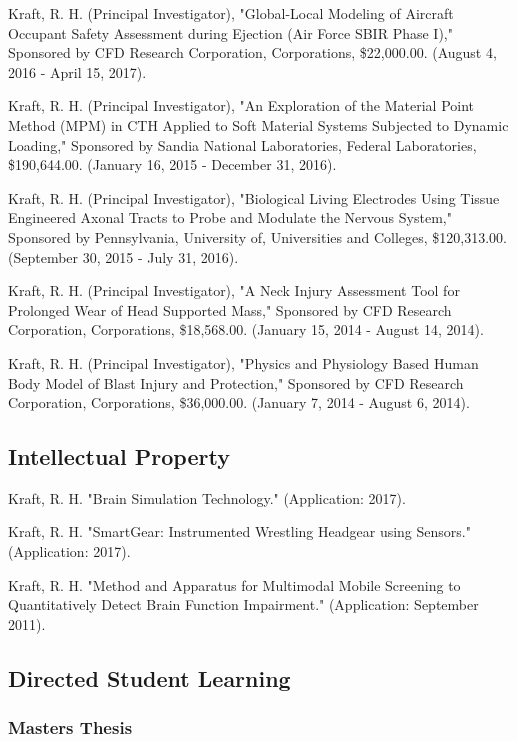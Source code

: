 \documentclass[
]{article}
\begin{document}
Kraft, R. H. (Principal Investigator), "Global-Local Modeling of
Aircraft Occupant Safety Assessment during Ejection (Air Force SBIR
Phase I)," Sponsored by CFD Research Corporation, Corporations,
\$22,000.00. (August 4, 2016 - April 15, 2017).

Kraft, R. H. (Principal Investigator), "An Exploration of the Material
Point Method (MPM) in CTH Applied to Soft Material Systems Subjected to
Dynamic Loading," Sponsored by Sandia National Laboratories, Federal
Laboratories, \$190,644.00. (January 16, 2015 - December 31, 2016).

Kraft, R. H. (Principal Investigator), "Biological Living Electrodes
Using Tissue Engineered Axonal Tracts to Probe and Modulate the Nervous
System," Sponsored by Pennsylvania, University of, Universities and
Colleges, \$120,313.00. (September 30, 2015 - July 31, 2016).

Kraft, R. H. (Principal Investigator), "A Neck Injury Assessment Tool
for Prolonged Wear of Head Supported Mass," Sponsored by CFD Research
Corporation, Corporations, \$18,568.00. (January 15, 2014 - August 14,
2014).

Kraft, R. H. (Principal Investigator), "Physics and Physiology Based
Human Body Model of Blast Injury and Protection," Sponsored by CFD
Research Corporation, Corporations, \$36,000.00. (January 7, 2014 -
August 6, 2014).

\subsection{Intellectual Property}\label{intellectual-property}

Kraft, R. H. "Brain Simulation Technology." (Application: 2017).

Kraft, R. H. "SmartGear: Instrumented Wrestling Headgear using Sensors."
(Application: 2017).

Kraft, R. H. "Method and Apparatus for Multimodal Mobile Screening to
Quantitatively Detect Brain Function Impairment." (Application:
September 2011).

\subsection{Directed Student Learning}\label{directed-student-learning}

\subsubsection{Master\textquotesingle s Thesis}\label{masters-thesis}
\end{document}
